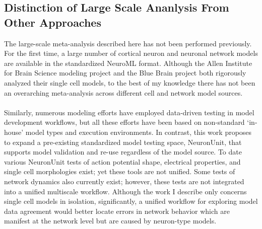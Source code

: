 \subsection{Distinction of Large Scale Ananlysis From Other Approaches}
The large-scale meta-analysis described here has not been performed previously. For the first time, a large number of cortical neuron and neuronal network models are available in the standardized NeuroML format. Although the Allen Institute for Brain Science modeling project and the Blue Brain project both rigorously analyzed their single cell models, to the best of my knowledge there has not been an overarching meta-analysis across different cell and network model sources.\\
\\
Similarly, numerous modeling efforts have employed data-driven testing in model development workflows, but all these efforts have been based on non-standard ‘in-house’ model types and execution environments. In contrast, this work proposes to expand a pre-existing standardized model testing space, NeuronUnit, that supports model validation and re-use regardless of the model source. To date various NeuronUnit tests of action potential shape, electrical properties, and single cell morphologies exist; yet these tools are not unified. Some tests of network dynamics also currently exist; however, these tests are not integrated into a unified multiscale workflow. Although the work I describe only concerns single cell models in isolation, significantly, a unified workflow for exploring model data agreement would better locate errors in network behavior which are manifest at the network level but are caused by neuron-type models. \newline
\newline

